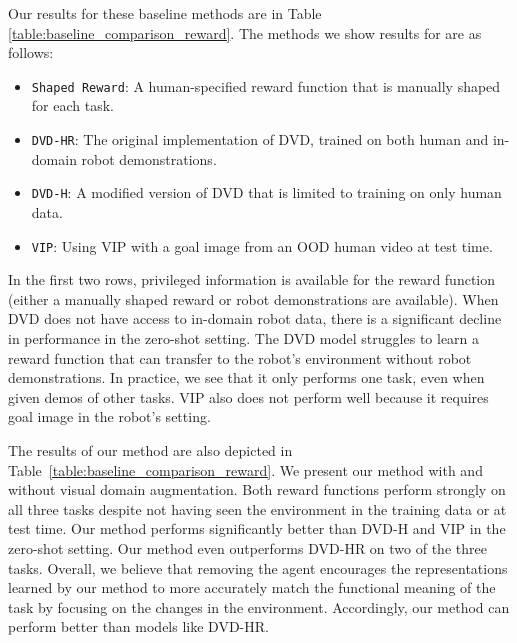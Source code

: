 Our results for these baseline methods are in Table \ref{table:baseline_comparison_reward}. The methods we show results for are as follows:

\begin{itemize}
    \item \verb|Shaped Reward|: A human-specified reward function that is manually shaped for each task.
    \item \verb|DVD-HR|: The original implementation of DVD, trained on both human and in-domain robot demonstrations.
    \item \verb|DVD-H|: A modified version of DVD that is limited to training on only human data.
    \item \verb|VIP|: Using VIP with a goal image from an OOD human video at test time.
\end{itemize}

In the first two rows, privileged information is available for the reward function (either a manually shaped reward or robot demonstrations are available). When DVD does not have access to in-domain robot data, there is a significant decline in performance in the zero-shot setting. The DVD model struggles to learn a reward function that can transfer to the robot's environment without robot demonstrations. In practice, we see that it only performs one task, even when given demos of other tasks. VIP also does not perform well because it requires goal image in the robot's setting.

The results of our method are also depicted in Table~\ref{table:baseline_comparison_reward}. We present our method with and without visual domain augmentation. Both reward functions perform strongly on all three tasks despite not having seen the environment in the training data or at test time. Our method performs significantly better than DVD-H and VIP in the zero-shot setting. Our method even outperforms DVD-HR on two of the three tasks. Overall, we believe that removing the agent encourages the representations learned by our method to more accurately match the functional meaning of the task by focusing on the changes in the environment. Accordingly, our method can perform better than models like DVD-HR.

